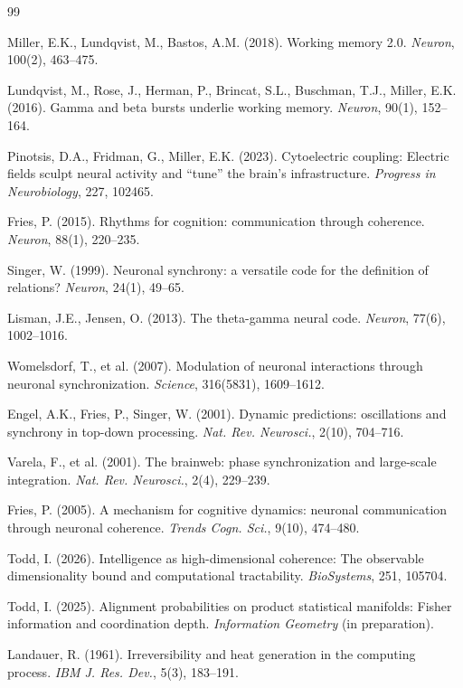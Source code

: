 \documentclass[12pt]{article}
\begin{document}
\begin{thebibliography}{99}

Miller, E.K., Lundqvist, M., Bastos, A.M. (2018). Working memory 2.0. \textit{Neuron}, 100(2), 463--475.

Lundqvist, M., Rose, J., Herman, P., Brincat, S.L., Buschman, T.J., Miller, E.K. (2016). Gamma and beta bursts underlie working memory. \textit{Neuron}, 90(1), 152--164.

Pinotsis, D.A., Fridman, G., Miller, E.K. (2023). Cytoelectric coupling: Electric fields sculpt neural activity and ``tune'' the brain's infrastructure. \textit{Progress in Neurobiology}, 227, 102465.

Fries, P. (2015). Rhythms for cognition: communication through coherence. \textit{Neuron}, 88(1), 220--235.

Singer, W. (1999). Neuronal synchrony: a versatile code for the definition of relations? \textit{Neuron}, 24(1), 49--65.

Lisman, J.E., Jensen, O. (2013). The theta-gamma neural code. \textit{Neuron}, 77(6), 1002--1016.

Womelsdorf, T., et al. (2007). Modulation of neuronal interactions through neuronal synchronization. \textit{Science}, 316(5831), 1609--1612.

Engel, A.K., Fries, P., Singer, W. (2001). Dynamic predictions: oscillations and synchrony in top-down processing. \textit{Nat. Rev. Neurosci.}, 2(10), 704--716.

Varela, F., et al. (2001). The brainweb: phase synchronization and large-scale integration. \textit{Nat. Rev. Neurosci.}, 2(4), 229--239.

Fries, P. (2005). A mechanism for cognitive dynamics: neuronal communication through neuronal coherence. \textit{Trends Cogn. Sci.}, 9(10), 474--480.

Todd, I. (2026). Intelligence as high-dimensional coherence: The observable dimensionality bound and computational tractability. \textit{BioSystems}, 251, 105704.

Todd, I. (2025). Alignment probabilities on product statistical manifolds: Fisher information and coordination depth. \textit{Information Geometry} (in preparation).

Landauer, R. (1961). Irreversibility and heat generation in the computing process. \textit{IBM J. Res. Dev.}, 5(3), 183--191.


\end{thebibliography}
\end{document}
